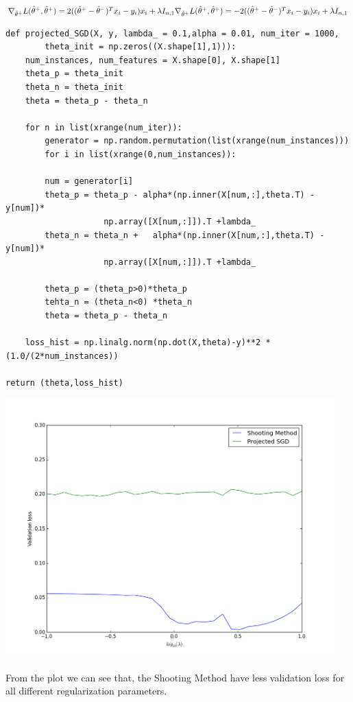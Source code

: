 \documentclass{article}
\begin{document}
$\nabla_{\hat{\theta}^+} L(\hat{\theta}^+, \hat{\theta}^+) = 2((\hat{\theta}^+ - \hat{\theta}^-)^Tx_i - y_i)x_i+ \lambda I_{n,1}\\
\nabla_{\hat{\theta}^+} L(\hat{\theta}^+, \hat{\theta}^+) = -2((\hat{\theta}^+ - \hat{\theta}^-)^Tx_i - y_i)x_i+ \lambda I_{n,1}
$

\begin{verbatim}
def projected_SGD(X, y, lambda_ = 0.1,alpha = 0.01, num_iter = 1000,
		theta_init = np.zeros((X.shape[1],1))):
	num_instances, num_features = X.shape[0], X.shape[1]
	theta_p = theta_init
	theta_n = theta_init
	theta = theta_p - theta_n
	
	for n in list(xrange(num_iter)):
		generator = np.random.permutation(list(xrange(num_instances))) 
		for i in list(xrange(0,num_instances)):
		
		num = generator[i]
		theta_p = theta_p - alpha*(np.inner(X[num,:],theta.T) - y[num])* 
					np.array([X[num,:]]).T +lambda_
		theta_n = theta_n +   alpha*(np.inner(X[num,:],theta.T) - y[num])* 
					np.array([X[num,:]]).T +lambda_
		
		theta_p = (theta_p>0)*theta_p
		tehta_n = (theta_n<0) *theta_n
		theta = theta_p - theta_n

	loss_hist = np.linalg.norm(np.dot(X,theta)-y)**2 *(1.0/(2*num_instances))

return (theta,loss_hist)
\end{verbatim}
\begin{center}
\includegraphics[width = 5in]{5_1.png}
\end{center}

From the plot we can see that, the Shooting Method have less validation loss for all different regularization parameters.  \\
\end{document}
